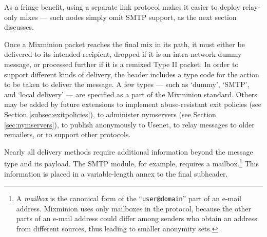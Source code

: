 \documentclass[times,10pt,twocolumn]{article}
\begin{document}
As a fringe benefit, using a separate link protocol makes it
easier to deploy relay-only mixes --- such nodes simply omit SMTP
support, as the next section discusses.  

\label{subsec:delivery-modules}


Once a Mixminion packet reaches the final mix in its path, it must
either be delivered to its intended recipient, dropped if it is an
intra-network dummy message, or processed further if it is a remixed
Type II packet. In order to support different kinds of
delivery, the header includes a type code for the action to be taken
to deliver the message.  A few types --- such as `dummy', `SMTP', and
`local delivery' --- are specified as a part of the Mixminion
standard.  Others may be added by future extensions to
implement abuse-resistant exit policies (see Section
\ref{subsec:exitpolicies}), to administer nymservers (see Section
\ref{sec:nymservers}), to publish anonymously to Usenet, to relay
messages to older remailers, or to support other protocols.  

Nearly all delivery methods require additional information beyond the
message type and its payload.  The SMTP module, for example, requires
a mailbox.\footnote{A {\it mailbox} is the canonical form of the
``{\tt user@domain}'' part of an e-mail address. Mixminion uses only
mailboxes in the protocol, because the other parts
of an e-mail address could differ among senders who
obtain an address from different sources, thus leading to smaller
anonymity sets.}
This information is placed
in a variable-length annex to the final subheader.
\end{document}
